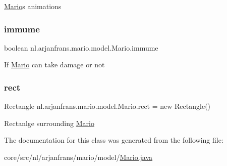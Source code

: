 \hyperlink{classnl_1_1arjanfrans_1_1mario_1_1model_1_1Mario}{Mario}\textquotesingle{}s animations \mbox{\label{classnl_1_1arjanfrans_1_1mario_1_1model_1_1Mario_a09b83e0286895f31f33418883c06ce01}} 
\subsubsection{\texorpdfstring{immume}{immume}}
{\footnotesize\ttfamily boolean nl.\+arjanfrans.\+mario.\+model.\+Mario.\+immume\hspace{0.3cm}{\ttfamily [private]}}

If \hyperlink{classnl_1_1arjanfrans_1_1mario_1_1model_1_1Mario}{Mario} can take damage or not \mbox{\label{classnl_1_1arjanfrans_1_1mario_1_1model_1_1Mario_a305117c37af2618742feafceffd893be}} 
\subsubsection{\texorpdfstring{rect}{rect}}
{\footnotesize\ttfamily Rectangle nl.\+arjanfrans.\+mario.\+model.\+Mario.\+rect = new Rectangle()\hspace{0.3cm}{\ttfamily [protected]}}

Rectanlge surrounding \hyperlink{classnl_1_1arjanfrans_1_1mario_1_1model_1_1Mario}{Mario} 

The documentation for this class was generated from the following file\+:\begin{DoxyCompactItemize}
\item 
core/src/nl/arjanfrans/mario/model/\hyperlink{Mario_8java}{Mario.\+java}\end{DoxyCompactItemize}
